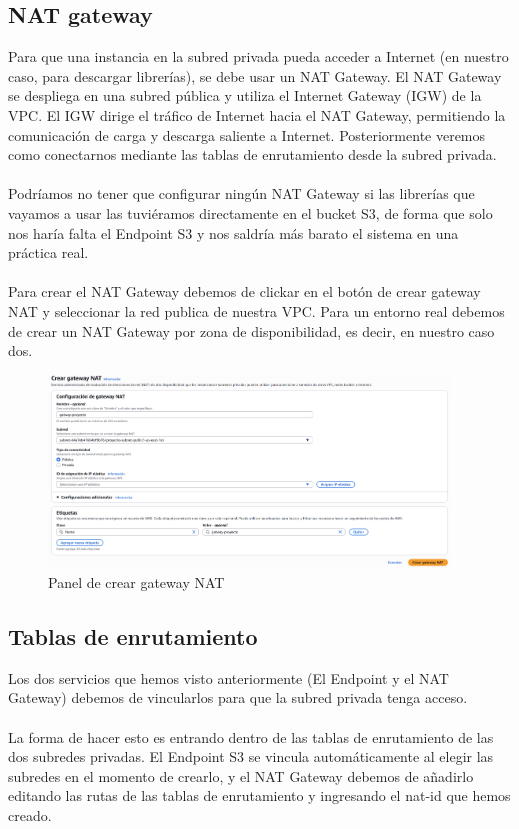 \documentclass{article}
\begin{document}
	\subsection{NAT gateway}

	Para que una instancia en la subred privada pueda acceder a Internet (en nuestro caso, para descargar librerías), se debe usar un NAT Gateway. El NAT Gateway se despliega en una subred pública y utiliza el Internet Gateway (IGW) de la VPC. El IGW dirige el tráfico de Internet hacia el NAT Gateway, permitiendo la comunicación de carga y descarga saliente a Internet. Posteriormente veremos como conectarnos mediante las tablas de enrutamiento desde la subred privada.
	\\\\
	Podríamos no tener que configurar ningún NAT Gateway si las librerías que vayamos a usar las tuviéramos directamente en el bucket S3, de forma que solo nos haría falta el Endpoint S3 y nos saldría más barato el sistema en una práctica real.
\\\\
	Para crear el NAT Gateway debemos de clickar en el botón de crear gateway NAT y seleccionar la red publica de nuestra VPC. Para un entorno real debemos de crear un NAT Gateway por zona de disponibilidad, es decir, en nuestro caso dos.

	\begin{figure}[H]
	\centering
	\includegraphics[width=0.95\textwidth]{crear_NAT_Gateway.png}
	\caption{Panel de crear gateway NAT}
	\end{figure}


	\subsection{Tablas de enrutamiento}

	Los dos servicios que hemos visto anteriormente (El Endpoint y el NAT Gateway) debemos de vincularlos para que la subred privada tenga acceso.
	\\\\ La forma de hacer esto es entrando dentro de las tablas de enrutamiento de las dos subredes privadas. El Endpoint S3 se vincula automáticamente al elegir las subredes en el momento de crearlo, y el NAT Gateway debemos de añadirlo editando las rutas de las tablas de enrutamiento y ingresando el nat-id que hemos creado.
\end{document}
